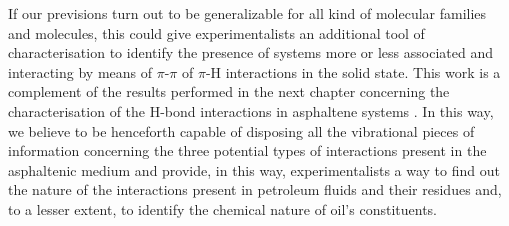If our previsions turn out to be generalizable for all kind of molecular families and molecules, this could give experimentalists an additional tool of characterisation to identify the presence of systems more or less associated and interacting by means of $\pi$-$\pi$ of $\pi$-H interactions in the solid state. This work is a complement of the results performed in the next chapter concerning the characterisation of the H-bond interactions in asphaltene systems \cite{sodero2016investigation,silva2016molecular}. In this way, we believe to be henceforth capable of disposing all the vibrational pieces of information concerning the three potential types of interactions present in the asphaltenic medium and provide, in this way, experimentalists a way to find out the nature of the interactions present in petroleum fluids and their residues and, to a lesser extent, to identify the chemical nature of oil’s constituents. 
 
 



